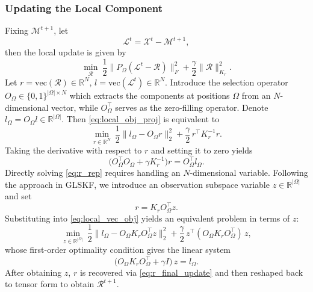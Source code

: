 \documentclass[a4paper,12pt]{article}
\numberwithin{equation}{section}
\numberwithin{algorithm}{section}
\theoremstyle{remark}
\theoremstyle{definition}
\begin{document}
\subsubsection{Updating the Local Component}
Fixing $\mathcal{M}^{t+1}$, let
\[
\mathcal{L}^t=\mathcal{X}^t-\mathcal{M}^{t+1},
\]
then the local update is given by
\begin{equation}
	\min_{\mathcal{R}}\ \frac12\big\|P_{\Omega}(\mathcal{L}^t-\mathcal{R})\big\|_F^2 + \frac{\gamma}{2}\|\mathcal{R}\|_{K_r}^2 .
	\label{eq:local_obj_proj}
\end{equation}
Let $r=\mathrm{vec}(\mathcal{R})\in\mathbb{R}^N$, $l=\mathrm{vec}(\mathcal{L}^t)\in\mathbb{R}^N$.
Introduce the selection operator $O_\Omega\in\{0,1\}^{|\Omega|\times N}$ which extracts the components at positions $\Omega$ from an $N$-dimensional vector, while $O_\Omega^\top$ serves as the zero-filling operator. Denote $l_\Omega = O_\Omega l\in\mathbb{R}^{|\Omega|}$.
Then \eqref{eq:local_obj_proj} is equivalent to
\begin{equation}
	\min_{r\in\mathbb{R}^N}\ \frac12\|l_\Omega - O_\Omega r\|_2^2 + \frac{\gamma}{2}\, r^\top K_r^{-1} r .
	\label{eq:local_vec_obj}
\end{equation}
Taking the derivative with respect to $r$ and setting it to zero yields
\begin{equation}
	\big(O_\Omega^\top O_\Omega + \gamma K_r^{-1}\big)r = O_\Omega^\top l_\Omega .
	\label{eq:r_rep}
\end{equation}
Directly solving \eqref{eq:r_rep} requires handling an $N$-dimensional variable. Following the approach in GLSKF\cite{lei2024glskf}, we introduce an observation subspace variable $z\in\mathbb{R}^{|\Omega|}$ and set
\begin{equation}
	r = K_r O_\Omega^\top z .
	\label{eq:r_final_update}
\end{equation}
Substituting into \eqref{eq:local_vec_obj} yields an equivalent problem in terms of $z$:
\begin{equation}
	\min_{z\in\mathbb{R}^{|\Omega|}}\
	\frac12\|l_\Omega - O_\Omega K_r O_\Omega^\top z\|_2^2
	+\frac{\gamma}{2}\, z^\top (O_\Omega K_r O_\Omega^\top)\, z ,
	\label{eq:local_z_obj}
\end{equation}
whose first-order optimality condition gives the linear system
\begin{equation}
	\big(O_\Omega K_r O_\Omega^\top + \gamma I\big)\, z = l_\Omega .
	\label{eq:z_linear_system}
\end{equation}
After obtaining $z$, $r$ is recovered via \eqref{eq:r_final_update} and then reshaped back to tensor form to obtain $\mathcal{R}^{t+1}$.
\end{document}
